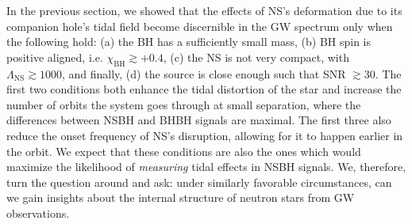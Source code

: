 \documentclass[aps,prd,amsmath,floats,floatfix, twocolumn,
superscriptaddress,nofootinbib,showpacs]{revtex4-1}
\newcommand{\red}{\textcolor{red}}
\newcommand{\prayush}{\textcolor{red!40!black}}
\newcommand{\lambdans}{\Lambda_\mathrm{NS}}
\newcommand{\chibh}{\chi_\mathrm{BH}}
\begin{document}
%

In the previous section, we showed that the effects of NS's deformation due to
its companion hole's tidal field become discernible in the GW spectrum only when
the following hold: (a) the BH has a sufficiently small mass, (b) BH spin
is positive aligned, i.e. $\chibh\gtrsim +0.4$, (c) the NS is not very compact,
with $\lambdans\gtrsim 1000$, and finally, (d) the source is close enough
such that SNR $\gtrsim 30$.
% 
The first two conditions both enhance the tidal distortion of the star and increase
the number of orbits the system goes through at small separation, where the
differences between NSBH and BHBH signals are maximal.
% 
The first three also reduce the onset frequency of NS's disruption, allowing
for it to happen earlier in the orbit. 
% 
We expect that these conditions are also the ones which would maximize the
likelihood of {\it measuring} tidal effects in NSBH signals. We, therefore,
%
%
%
turn the question around and ask: under similarly favorable circumstances, can
we gain insights about the internal structure of neutron stars from GW observations.
\end{document}
